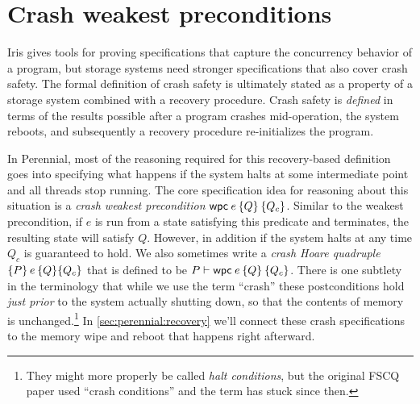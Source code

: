 \section{Crash weakest preconditions}
\label{sec:perennial:wpc}

\newcommand{\propc}{P_c}
\newcommand{\propcB}{Q_c}
\newcommand{\propcC}{R_c}

\newcommand{\wpcseqfig}{%
\begin{mathpar}
\inferH{wpc-value}
{}{\propc \land [\val/\var]\prop \proves \wpc{\val}{\Ret\var \prop}{\propc}}

\inferH{wpc-mono}
{\propc \proves \propcB \and \forall \val.\,\left([\val/\var]\prop \proves [\val/\var]\propB\right)}
{\wpc\expr{\Ret\var \prop}{\propc} \proves \wpc\expr{\Ret\var \propB}{\propcB}}


\inferH{wpc-frame}
{}{\propB * \wpc\expr{\prop}{\propc} \proves \wpc\expr{\propB*\prop}{\propB*\propc}}

\inferH{wp-wpc}
{}{\wpre\expr{\Ret\var \prop} \dashv\proves \wpc\expr{\Ret\var \prop}{\TRUE}}


\inferH{wpc-atomic}
{\atomic(\expr)}
{\propc \land \wpre\expr{\Ret\var  \propc \land \prop}
 \proves \wpc\expr{\Ret\var \prop}{\propc}}
\end{mathpar}
}

Iris gives tools for proving specifications that capture the concurrency
behavior of a program, but storage systems need stronger specifications that
also cover crash safety. The formal definition of crash safety is ultimately
stated as a property of a storage system combined with a recovery procedure.
Crash safety is \emph{defined} in terms of the results possible after a program
crashes mid-operation, the system reboots, and subsequently a recovery procedure
re-initializes the program.

In Perennial, most of the reasoning required for this recovery-based definition
goes into specifying what happens if the system halts at some intermediate point
and all threads stop running. The core specification idea for reasoning about
this situation is a \emph{crash weakest precondition} $\wpc{e}{Q}{Q_{c}}$. Similar
to the weakest precondition, if $e$ is run from a state satisfying this
predicate and terminates, the resulting state will satisfy $Q$. However, in
addition if the system halts at any time $Q_{c}$ is guaranteed to hold. We also
sometimes write a \emph{crash Hoare quadruple} $\hoareC{P}{e}{Q}{Q_{c}}$ that is
defined to be $P \proves \wpc{e}{Q}{Q_{c}}$. There is one subtlety in the
terminology that while we use the term ``crash'' these postconditions hold
\emph{just prior} to the system actually shutting down, so that the contents of
memory is unchanged.\footnote{They might more properly be called \emph{halt
conditions}, but the original FSCQ paper used ``crash conditions'' and the term has
stuck since then.} In \cref{sec:perennial:recovery} we'll connect these
crash specifications to the memory wipe and reboot that happens right afterward.


